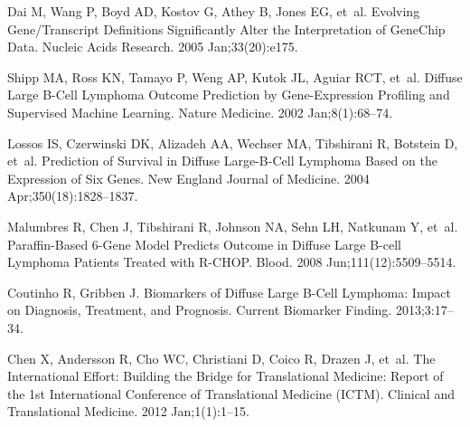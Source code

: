 \documentclass[10pt,letterpaper]{article}
\begin{document}
\begin{thebibliography}{10}
Dai M, Wang P, Boyd AD, Kostov G, Athey B, Jones EG, et~al.
\newblock Evolving {Gene/Transcript} Definitions Significantly Alter the
  Interpretation of {GeneChip} Data.
\newblock Nucleic Acids Research. 2005 Jan;33(20):e175.

Shipp MA, Ross KN, Tamayo P, Weng AP, Kutok JL, Aguiar RCT, et~al.
\newblock Diffuse Large {B}-Cell Lymphoma Outcome Prediction by Gene-Expression
  Profiling and Supervised Machine Learning.
\newblock Nature Medicine. 2002 Jan;8(1):68--74.

Lossos IS, Czerwinski DK, Alizadeh AA, Wechser MA, Tibshirani R, Botstein D,
  et~al.
\newblock Prediction of Survival in Diffuse Large-{B}-Cell Lymphoma Based on
  the Expression of Six Genes.
\newblock New England Journal of Medicine. 2004 Apr;350(18):1828--1837.

Malumbres R, Chen J, Tibshirani R, Johnson NA, Sehn LH, Natkunam Y, et~al.
\newblock Paraffin-Based 6-Gene Model Predicts Outcome in Diffuse Large
  {B}-cell Lymphoma Patients Treated with {R-CHOP}.
\newblock Blood. 2008 Jun;111(12):5509--5514.

Coutinho R, Gribben J.
\newblock Biomarkers of Diffuse Large {B}-Cell Lymphoma: Impact on Diagnosis,
  Treatment, and Prognosis.
\newblock Current Biomarker Finding. 2013;3:17--34.

Chen X, Andersson R, Cho WC, Christiani D, Coico R, Drazen J, et~al.
\newblock The International Effort: Building the Bridge for Translational
  Medicine: Report of the 1st International Conference of Translational
  Medicine {(ICTM)}.
\newblock Clinical and Translational Medicine. 2012 Jan;1(1):1--15.

\end{thebibliography}
\end{document}
